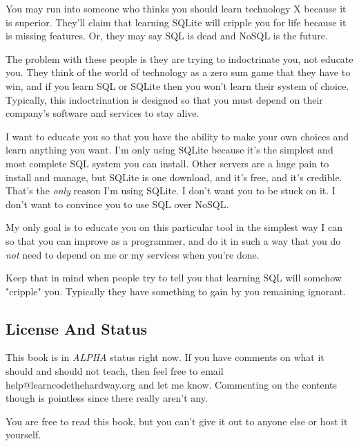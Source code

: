 You may run into someone who thinks you should learn technology X because 
it is superior.  They'll claim that learning SQLite will cripple you for
life because it is missing features.  Or, they may say SQL is dead and
NoSQL is the future.

The problem with these people is they are trying to indoctrinate you, not
educate you.  They think of the world of technology as a zero sum game
that they have to win, and if you learn SQL or SQLite then you won't
learn their system of choice.  Typically, this indoctrination is designed
so that you must depend on their company's software and services to 
stay alive.

I want to educate you so that you have the ability to make your own choices and
learn anything you want.  I'm only using SQLite because it's the simplest and
most complete SQL system you can install.  Other servers are a huge pain to
install and manage, but SQLite is one download, and it's free, and it's
credible. That's the \emph{only} reason I'm using SQLite.  I don't want you to
be stuck on it.  I don't want to convince you to use SQL over NoSQL.

My only goal is to educate you on this particular tool in the simplest way
I can so that you can improve as a programmer, and do it in such a way that
you do \emph{not} need to depend on me or my services when you're done.

Keep that in mind when people try to tell you that learning SQL will somehow
"cripple" you.  Typically they have something to gain by you remaining
ignorant.

\subsection*{License And Status}

This book is in \emph{ALPHA} status right now.  If you have comments on what it
should and should not teach, then feel free to email help@learncodethehardway.org
and let me know.  Commenting on the contents though is pointless since there
really aren't any.

You are free to read this book, but you can't give it out to anyone else or
host it yourself.


